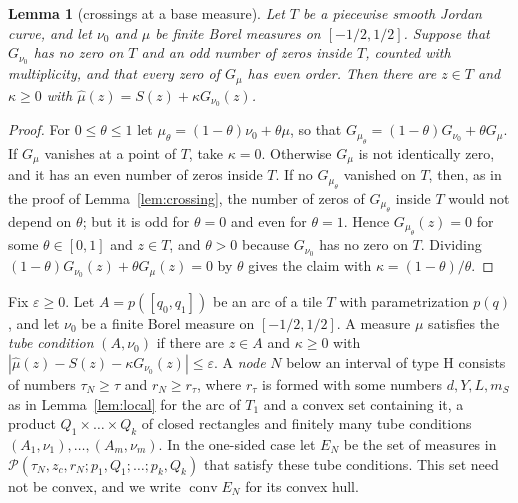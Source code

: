 \documentclass[11pt]{amsart}
\newtheorem{lemma}[theorem]{Lemma}
\theoremstyle{definition}
\theoremstyle{remark}
\numberwithin{equation}{section}
\begin{document}
\begin{lemma}[crossings at a base measure]\label{lem:basecross}
Let $T$ be a piecewise smooth Jordan curve, and let $\nu_0$ and $\mu$ be finite Borel measures on $[-1/2,1/2]$. Suppose that $G_{\nu_0}$ has no zero on $T$ and an odd number of zeros inside $T$, counted with multiplicity, and that every zero of $G_\mu$ has even order. Then there are $z\in T$ and $\kappa\ge0$ with $\hat\mu(z)=S(z)+\kappa G_{\nu_0}(z)$.
\end{lemma}

\begin{proof}
For $0\le\theta\le1$ let $\mu_\theta=(1-\theta)\nu_0+\theta\mu$, so that $G_{\mu_\theta}=(1-\theta)G_{\nu_0}+\theta G_\mu$. If $G_\mu$ vanishes at a point of $T$, take $\kappa=0$. Otherwise $G_\mu$ is not identically zero, and it has an even number of zeros inside $T$. If no $G_{\mu_\theta}$ vanished on $T$, then, as in the proof of Lemma~\ref{lem:crossing}, the number of zeros of $G_{\mu_\theta}$ inside $T$ would not depend on $\theta$; but it is odd for $\theta=0$ and even for $\theta=1$. Hence $G_{\mu_\theta}(z)=0$ for some $\theta\in[0,1]$ and $z\in T$, and $\theta>0$ because $G_{\nu_0}$ has no zero on $T$. Dividing $(1-\theta)G_{\nu_0}(z)+\theta G_\mu(z)=0$ by $\theta$ gives the claim with $\kappa=(1-\theta)/\theta$.
\end{proof}

Fix $\varepsilon\ge0$. Let $A=p([q_0,q_1])$ be an arc of a tile $T$ with parametrization $p(q)$, and let $\nu_0$ be a finite Borel measure on $[-1/2,1/2]$. A measure $\mu$ satisfies the \emph{tube condition} $(A,\nu_0)$ if there are $z\in A$ and $\kappa\ge0$ with $|\hat\mu(z)-S(z)-\kappa G_{\nu_0}(z)|\le\varepsilon$. A \emph{node} $N$ below an interval of type H consists of numbers $\tau_N\ge\tau$ and $r_N\ge r_\tau$, where $r_\tau$ is formed with some numbers $d,Y,L,m_S$ as in Lemma~\ref{lem:local} for the arc of $T_1$ and a convex set containing it, a product $Q_1\times\dots\times Q_k$ of closed rectangles and finitely many tube conditions $(A_1,\nu_1),\dots,(A_m,\nu_m)$. In the one-sided case let $E_N$ be the set of measures in $\mathcal P(\tau_N,z_c,r_N;p_1,Q_1;\dots;p_k,Q_k)$ that satisfy these tube conditions. This set need not be convex, and we write $\operatorname{conv}E_N$ for its convex hull.
\end{document}
